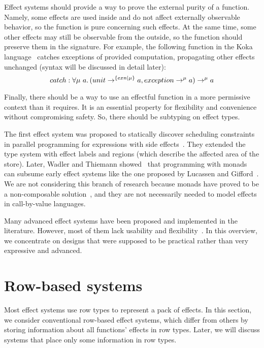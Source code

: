 \documentclass[conference]{IEEEtran}
\newcommand{\ap}{~}
\begin{document}
    Effect systems should provide a way to prove the external purity of a function.
    Namely, some effects are used inside and do not affect externally observable behavior, so the function is pure concerning such effects.
    At the same time, some other effects may still be observable from the outside, so the function should preserve them in the signature.
    For example, the following function in the Koka language~\cite{leijen2014koka, leijen2017type} catches exceptions of provided computation, propagating other effects unchanged (syntax will be discussed in detail later):
    \[catch : \forall \mu\ap a\ldotp (unit\to^{\{exn|\mu\}} a, exception \to^{\mu} a) \to^\mu a\]

    Finally, there should be a way to use an effectful function in a more permissive context than it requires.
    It is an essential property for flexibility and convenience without compromising safety.
    So, there should be subtyping on effect types.


    The first effect system was proposed to statically discover scheduling constraints in parallel programming for expressions with side effects~\cite{lucassen1988polymorphic}.
    They extended the type system with effect labels and regions (which describe the affected area of the store).
    Later, Wadler and Thiemann showed~\cite{wadler2003marriage} that programming with monads~\cite{moggi1988computational, wadler1995monads} can subsume early effect systems like the one proposed by Lucassen and Gifford~\cite{lucassen1988polymorphic}.
    We are not considering this branch of research because monads have proved to be a non-composable solution~\cite{liang1995monad, kiselyov2013extensible}, and they are not necessarily needed to model effects in call-by-value languages.

    Many advanced effect systems have been proposed and implemented in the literature.
    However, most of them lack usability and flexibility~\cite{odersky2022scoped}.
    In this overview, we concentrate on designs that were supposed to be practical rather than very expressive and advanced.


    \section{Row-based systems} \label{sec:rows}

    Most effect systems use row types to represent a pack of effects.
    In this section, we consider conventional row-based effect systems, which differ from others by storing information about all functions' effects in row types.
    Later, we will discuss systems that place only some information in row types.
\end{document}
